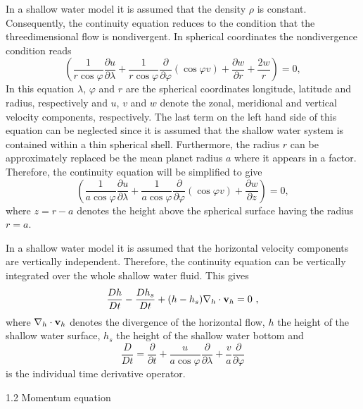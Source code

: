 In a shallow water model it is assumed 
that the density $\rho$ is constant. Consequently, the continuity equation reduces to the
condition that the threedimensional flow is nondivergent.
In spherical coordinates the nondivergence condition reads
\begin{equation}
\left ( \frac  1 {r \cos \varphi}  \frac {\partial u} {\partial \lambda}
            +\frac  1 {r \cos \varphi}  \frac {\partial } {\partial \varphi} (\cos \varphi v)
                    +  \frac {\partial w} {\partial r}   + \frac {2 w} r      \right ) =0,
\end{equation}
In this equation $\lambda$, $\varphi$ and $r$ are the spherical coordinates longitude, latitude and 
radius, respectively and $u$, $v$ and $w$ denote the zonal, meridional and vertical velocity components, respectively. The last term on the left hand side of this equation can be neglected since it is assumed that
the shallow water system is contained within a thin spherical shell. Furthermore, the radius $r$ can be approximately
replaced be the mean planet radius $a$ where it appears in a factor.
Therefore, the continuity equation will be simplified to give
\begin{equation}
\left ( \frac  1 {a \cos \varphi}  \frac {\partial u} {\partial \lambda}
            +\frac  1 {a \cos \varphi}  \frac {\partial } {\partial \varphi} (\cos \varphi v)
                    +  \frac {\partial w} {\partial z}       \right ) =0,
\end{equation}
where $z=r-a$ denotes the height above the spherical surface having the radius $r=a$.

In a shallow water model it is assumed that the horizontal velocity components are vertically
independent. Therefore, the continuity equation can be vertically integrated over the whole
shallow water fluid. This gives
\begin{equation}
\frac {D h} {Dt} - \frac {D h_s} {Dt} + (h-h_s) \nabla_h \cdot {\bf v}_h = 0~,
\end{equation}
where $\nabla_h \cdot {\bf v}_h$ denotes the divergence of the horizontal flow, $h$
the height of the shallow water surface, $h_s$ the height of the shallow water bottom
and 
\[
\frac {D} {Dt}=\frac {\partial } {\partial t} + \frac u {a \cos {\varphi}} 
\frac {\partial} {\partial \lambda} + \frac v {a} 
\frac {\partial} {\partial \varphi} 
\]
is the individual time derivative operator.

1.2 Momentum equation

\nopagebreak[4]

